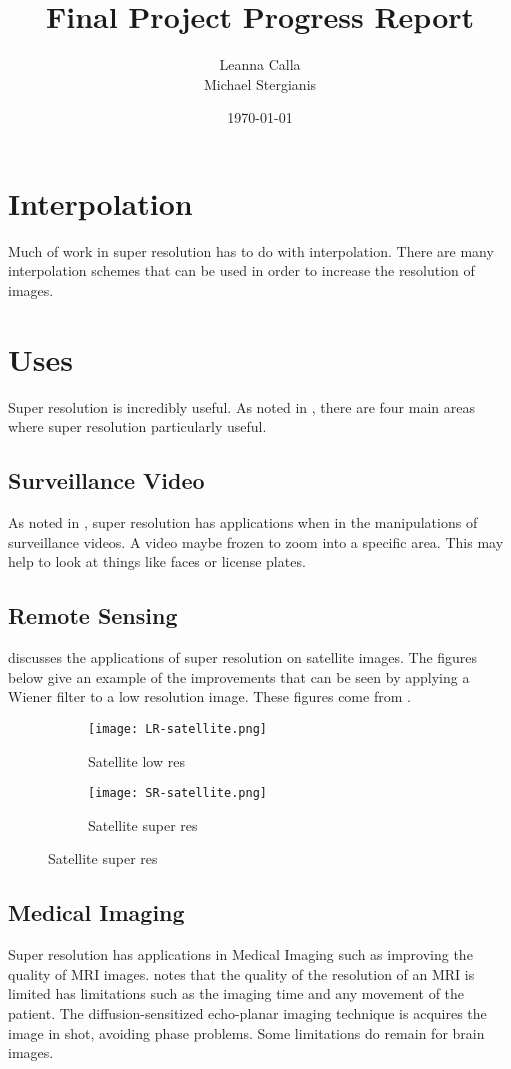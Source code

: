 \documentclass{article}
\title{Final Project Progress Report}
\author{Leanna Calla\\Michael Stergianis}
\date{\today}
\begin{document}
\maketitle
\section{Interpolation}
\label{sec:interpolation}
Much of work in super resolution has to do with interpolation.  There
are many interpolation schemes that can be used in order to increase
the resolution of images.
%
%
\section{Uses}
\label{sec:uses}

Super resolution is incredibly useful. As noted in
\cite{Yang2010ImageSH}, there are four main areas where super
resolution particularly useful.
\subsection{Surveillance Video}
As noted in \cite{Yang2010ImageSH}, super resolution has applications
when in the manipulations of surveillance videos. A video maybe frozen
to zoom into a specific area. This may help to look at things like faces or license plates.
\subsection{Remote Sensing}
\cite{Li} discusses the applications of super resolution on satellite
images. The figures below give an example of the improvements that can
be seen by applying a Wiener filter to a low resolution image. These
figures come from \cite{Li}.    
\begin{figure}[H]
  \centering
  \begin{subfigure}[b]{0.5\textwidth}
    \centering
  \texttt{[image: LR-satellite.png]}
  \caption{\label{fig:label} Satellite low res }
\end{subfigure}%
\begin{subfigure}[b]{0.5\textwidth}
  \centering
  \texttt{[image: SR-satellite.png]}
  \caption{\label{fig:label} Satellite super res }
  \end{subfigure}
\end{figure}


\subsection{Medical Imaging}
Super resolution has applications in Medical Imaging such as improving
the quality of MRI images. \cite{Peled} notes that the quality of the resolution of
an MRI is limited has limitations such as the imaging time and any
movement of the patient. The diffusion-sensitized echo-planar imaging
technique is acquires the image in shot, avoiding phase problems. Some
limitations do remain for brain images.  
\end{document}
